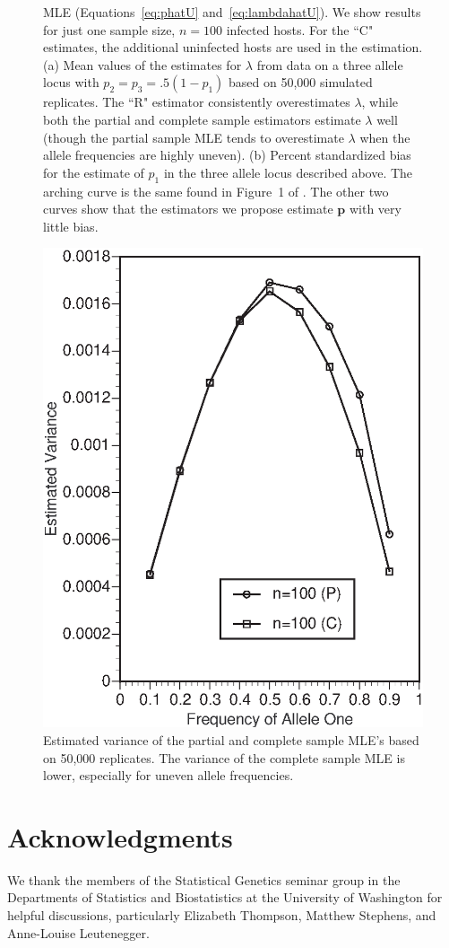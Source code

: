 \documentclass[12pt,titlepage]{article}
\newcommand{\bp}{\mathbf{p}}
\begin{document}
\begin{figure}
{MLE (Equations~\ref{eq:phatU} and~\ref{eq:lambdahatU}).  We show results for just one
sample size, $n=100$  infected hosts. For the ``C" estimates, the additional
uninfected hosts are used in the estimation.  (a) Mean values of the estimates for
$\lambda$ from data on a three allele locus with
$p_2 = p_3 = .5(1-p_1)$ based on 50,000 simulated replicates.  The ``R" estimator
consistently overestimates $\lambda$, while both the partial and complete sample
estimators estimate $\lambda$ well (though the partial sample MLE tends to overestimate
$\lambda$ when the allele frequencies are highly uneven).  (b) Percent standardized bias
for the estimate of
$p_1$ in the three allele locus described above. The arching curve is the same found in
Figure~1 of
\protect{}.  The other two curves show that the estimators
we propose estimate
$\bp$ with very little bias.}
\label{fig:BiasVar}
\end{figure}

\begin{figure}
\begin{center}
\includegraphics*[width=.4\textwidth]{VarianceGraph.eps}
\end{center}
\caption{Estimated variance of the partial and complete sample MLE's based on 50,000
replicates.  The variance of the complete sample MLE is lower, especially for uneven
allele frequencies.}
\label{fig:VarGraph}
\end{figure}

\section{Acknowledgments}
We thank the members of the Statistical Genetics seminar group in the Departments of
Statistics and Biostatistics at the University of Washington for helpful discussions,
particularly Elizabeth Thompson, Matthew Stephens, and Anne-Louise Leutenegger.




\end{document}
